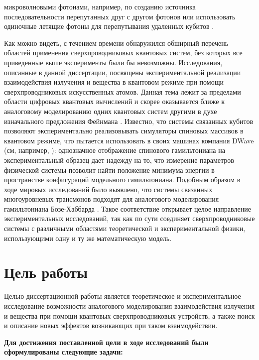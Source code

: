 \documentclass[14pt, a4paper]{extreport}
\numberwithin{equation}{section}
\begin{document}
микроволновыми фотонами, например, по созданию источника последовательности перепутанных друг с другом фотонов \cite{besse2020realizing} или использовать одиночные летящие фотоны для перепутывания удаленных кубитов \cite{kurpiers2018deterministic}.

Как можно видеть, с течением времени обнаружился обширный перечень областей применения сверхпроводниковых квантовых систем, без которых все приведенные выше эксперименты были бы невозможны. Исследования, описанные в данной диссертации, посвящены экспериментальной реализации взаимодействия излучения и вещества в квантовом режиме при помощи сверхпроводниковых искусственных атомов. Данная тема лежит за пределами области цифровых квантовых вычислений и скорее оказывается ближе к аналоговому моделированию одних квантовых систем другими в духе изначального предложения Фейнмана \cite{feynman1982simulating}. Известно, что системы связанных кубитов позволяют экспериментально реализовывать симуляторы спиновых массивов в квантовом режиме, что пытается использовать в своих машинах компания DWave (см, например, \cite{harris2018phase}): однозначное отображение спинового гамильтониана на экспериментальный образец дает надежду на то, что измерение параметров физической системы позволит найти положение минимума энергии в пространстве конфигураций модельного гамильтониана. Подобным образом в ходе мировых исследований было выявлено, что системы связанных многоуровневых трансмонов подходят для аналогового моделирования гамильтониана Бозе-Хаббарда \cite{Orell2019, Ma2019, Hacohen-Gourgy2015, Deng2016, Ye2019, Yan2019}. Такое соответствие открывает целое направление экспериментальных исследований, так как по сути соединяет сверхпроводниковые системы с различными областями теоретической и экспериментальной физики, использующими одну и ту же математическую модель.

\section*{Цель работы}

Целью диссертационной работы является теоретическое и экспериментальное исследование возможности аналогового моделирования взаимодействия излучения и вещества при помощи квантовых сверхпроводниковых устройств, а также поиск и описание новых эффектов возникающих при таком взаимодействии.

\textbf{Для достижения поставленной цели в ходе исследований были сформулированы следующие задачи:}
\end{document}
